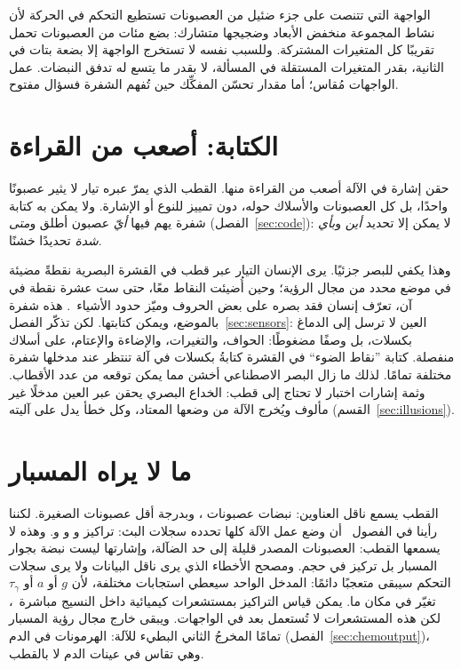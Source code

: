 \begin{keyblock}
\begin{proposition}
\label{prop:probe}
الواجهة التي تتنصت على جزء ضئيل من العصبونات تستطيع التحكم في الحركة لأن نشاط المجموعة منخفض الأبعاد وضجيجها متشارك: بضع مئات من العصبونات تحمل تقريبًا كل المتغيرات المشتركة. وللسبب نفسه لا تستخرج الواجهة إلا بضعة بتات في الثانية، بقدر المتغيرات المستقلة في المسألة، لا بقدر ما يتسع له تدفق النبضات. عمل الواجهات مُقاس؛ أما مقدار تحسّن المفكِّك حين تُفهم الشفرة فسؤال مفتوح.
\end{proposition}
\end{keyblock}

\section{الكتابة: أصعب من القراءة}

حقن إشارة في الآلة أصعب من القراءة منها. القطب الذي يمرّ عبره تيار لا يثير عصبونًا واحدًا، بل كل العصبونات والأسلاك حوله، دون تمييز للنوع أو الإشارة. ولا يمكن به كتابة شفرة يهم فيها \emph{أيّ} عصبون أطلق و\emph{متى} (الفصل~\ref{sec:code}): لا يمكن إلا تحديد \emph{أين} و\emph{بأي شدة} تحديدًا خشنًا.

وهذا يكفي للبصر جزئيًا. يرى الإنسان التيار عبر قطب في القشرة البصرية نقطةً مضيئة في موضع محدد من مجال الرؤية؛ وحين أُضيئت النقاط معًا، حتى ست عشرة نقطة في آن، تعرّف إنسان فقد بصره على بعض الحروف وميّز حدود الأشياء~\cite{Fernandez2021}. هذه شفرة بالموضع، ويمكن كتابتها. لكن تذكّر الفصل~\ref{sec:sensors}: العين لا ترسل إلى الدماغ بكسلات، بل وصفًا مضغوطًا: الحواف، والتغيرات، والإضاءة والإعتام، على أسلاك منفصلة. كتابة ”نقاط الضوء“ في القشرة كتابةُ بكسلات في آلة تنتظر عند مدخلها شفرة مختلفة تمامًا. لذلك ما زال البصر الاصطناعي أخشن مما يمكن توقعه من عدد الأقطاب. وثمة إشارات اختبار لا تحتاج إلى قطب: الخداع البصري يحقن عبر العين مدخلًا غير مألوف ويُخرج الآلة من وضعها المعتاد، وكل خطأ يدل على آليته (القسم~\ref{sec:illusions}).

\section{ما لا يراه المسبار}

القطب يسمع ناقل العناوين: نبضات عصبونات ، وبدرجة أقل عصبونات  الصغيرة. لكننا رأينا في الفصول~\babelsublr{\ref{sec:serocomputer}--\ref{sec:acet}} أن وضع عمل الآلة كلها تحدده سجلات البث: تراكيز  و و و. وهذه لا يسمعها القطب: العصبونات المصدر قليلة إلى حد الضآلة، وإشارتها ليست نبضة بجوار المسبار بل تركيز في حجم. ومصحح الأخطاء الذي يرى ناقل البيانات ولا يرى سجلات التحكم سيبقى متعجبًا دائمًا: المدخل الواحد سيعطي استجابات مختلفة، لأن $g$ أو $a$ أو $\tau_\gamma$ تغيّر في مكان ما. يمكن قياس التراكيز بمستشعرات كيميائية داخل النسيج مباشرة~\cite{Bunin1998}، لكن هذه المستشعرات لا تُستعمل بعد في الواجهات. ويبقى خارج مجال رؤية المسبار تمامًا المخرجُ الثاني البطيء للآلة: الهرمونات في الدم (الفصل~\ref{sec:chemoutput})، وهي تقاس في عينات الدم لا بالقطب.

